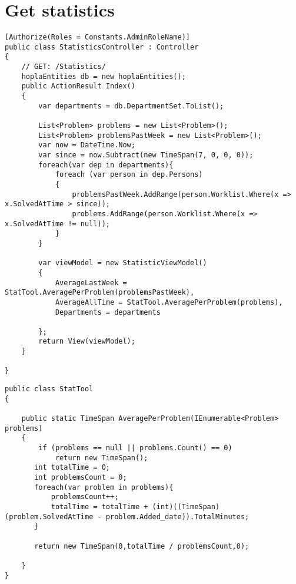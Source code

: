 \section{Get statistics}
\label{sec:getstatistics}




\begin{lstlisting}[style=sourceCode, caption=\myCaption{The StatisticsController controller}, label=lst:getstatistics,float=hp]
[Authorize(Roles = Constants.AdminRoleName)]
public class StatisticsController : Controller
{
    // GET: /Statistics/
    hoplaEntities db = new hoplaEntities();
    public ActionResult Index()
    {
        var departments = db.DepartmentSet.ToList();
        
        List<Problem> problems = new List<Problem>();
        List<Problem> problemsPastWeek = new List<Problem>();
        var now = DateTime.Now;
        var since = now.Subtract(new TimeSpan(7, 0, 0, 0));
        foreach(var dep in departments){
            foreach (var person in dep.Persons)
            {
                problemsPastWeek.AddRange(person.Worklist.Where(x => x.SolvedAtTime > since));
                problems.AddRange(person.Worklist.Where(x => x.SolvedAtTime != null));
            }
        }

        var viewModel = new StatisticViewModel()
        {
            AverageLastWeek = StatTool.AveragePerProblem(problemsPastWeek),
            AverageAllTime = StatTool.AveragePerProblem(problems),
            Departments = departments
            
        };
        return View(viewModel);
    }

}
\end{lstlisting}


\begin{lstlisting}[style=sourceCode, caption=\myCaption{The AveragePerProblem(IEnumerable<Problem> problems) method -- which is found in the \cl{StatTool} class.}, label=lst:averageperproblem]
public class StatTool
{
   
    public static TimeSpan AveragePerProblem(IEnumerable<Problem> problems)
    {
        if (problems == null || problems.Count() == 0)
            return new TimeSpan();
       int totalTime = 0; 
       int problemsCount = 0;
       foreach(var problem in problems){
           problemsCount++;
           totalTime = totalTime + (int)((TimeSpan)(problem.SolvedAtTime - problem.Added_date)).TotalMinutes;
       }

       return new TimeSpan(0,totalTime / problemsCount,0);
       
    }
}
\end{lstlisting}

